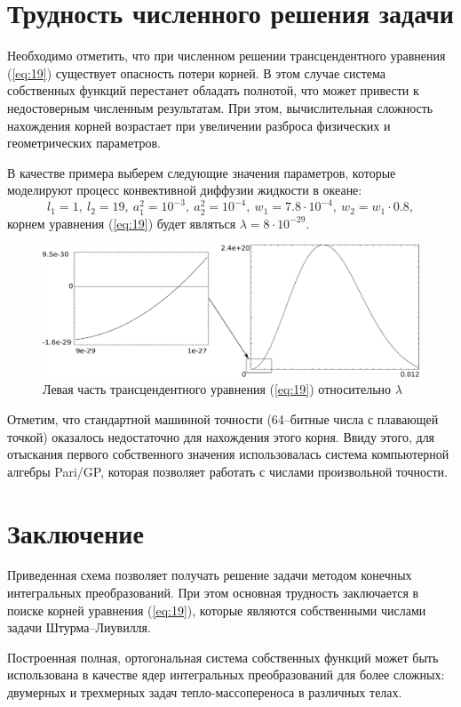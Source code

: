 \documentclass[12pt, a4paper]{article}
\begin{document}
\section{Трудность численного решения задачи}
Необходимо отметить, что при численном решении трансцендентного уравнения (\ref{eq:19}) существует опасность потери корней.
В этом случае система собственных функций перестанет обладать полнотой, что может привести к недостоверным численным результатам.
При этом, вычислительная сложность нахождения корней возрастает при увеличении разброса физических и геометрических параметров.

В качестве примера выберем следующие значения параметров, которые моделируют процесс конвективной диффузии жидкости в океане:
\begin{equation*}
  l_1=1,\ l_2=19,\ a_1^2=10^{-3},\ a_2^2=10^{-4},\ w_1=7.8\cdot 10^{-4},\ w_2=w_1 \cdot 0.8,
\end{equation*}
корнем уравнения (\ref{eq:19}) будет являться $\lambda=8 \cdot 10^{-29}$.
\begin{figure}[H]
 \includegraphics[width=16cm]{full.eps}
 \caption{Левая часть трансцендентного уравнения (\ref{eq:19}) относительно $\lambda$}
 \label{fig2}
\end{figure}
Отметим, что стандартной машинной точности (64--битные числа с плавающей точкой) оказалось недостаточно для нахождения этого корня.
Ввиду этого, для отыскания первого собственного значения использовалась система компьютерной алгебры Pari/GP, 
которая позволяет работать с числами произвольной точности.

\section{Заключение}
Приведенная схема позволяет получать решение задачи методом конечных интегральных преобразований.
При этом основная трудность заключается в поиске корней уравнения (\ref{eq:19}), которые являются
собственными числами задачи Штурма--Лиувилля.

Построенная полная, ортогональная система собственных функций может быть использована в качестве ядер
интегральных преобразований для более сложных: двумерных и трехмерных задач тепло-массопереноса в различных телах.
\end{document}
